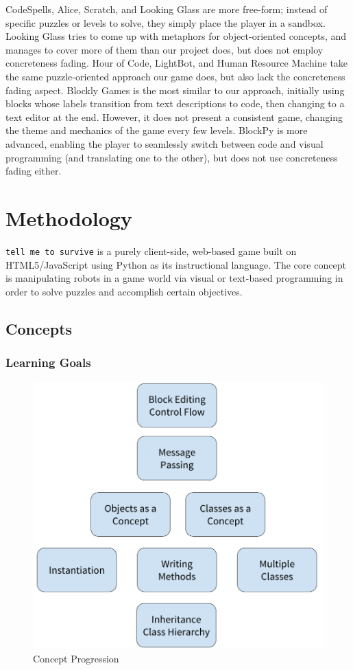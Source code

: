 \documentclass[12pt,notitlepage]{article}
\newcommand\tmts[0]{\texttt{tell me to survive}}
\begin{document}
CodeSpells, Alice, Scratch, and Looking Glass are more free-form;
instead of specific puzzles or levels to solve, they simply place the
player in a sandbox. Looking Glass tries to come up with metaphors for
object-oriented concepts, and manages to cover more of them than our
project does, but does not employ concreteness fading. Hour of Code,
LightBot, and Human Resource Machine take the same puzzle-oriented
approach our game does, but also lack the concreteness fading
aspect. Blockly Games is the most similar to our approach, initially
using blocks whose labels transition from text descriptions to code,
then changing to a text editor at the end. However, it does not
present a consistent game, changing the theme and mechanics of the
game every few levels. BlockPy is more advanced, enabling the player
to seamlessly switch between code and visual programming (and
translating one to the other), but does not use concreteness fading
either.

\section{Methodology}

\tmts{} is a purely client-side, web-based game built on
HTML5/JavaScript using Python as its instructional language. The core
concept is manipulating robots in a game world via visual or
text-based programming in order to solve puzzles and accomplish
certain objectives.

\subsection{Concepts}

\subsubsection{Learning Goals}

\begin{figure}[h]
  \centering
  \includegraphics[width=.6\textwidth]{progression}
  \caption{Concept Progression}
\label{fig:progression}
\end{figure}
\end{document}
